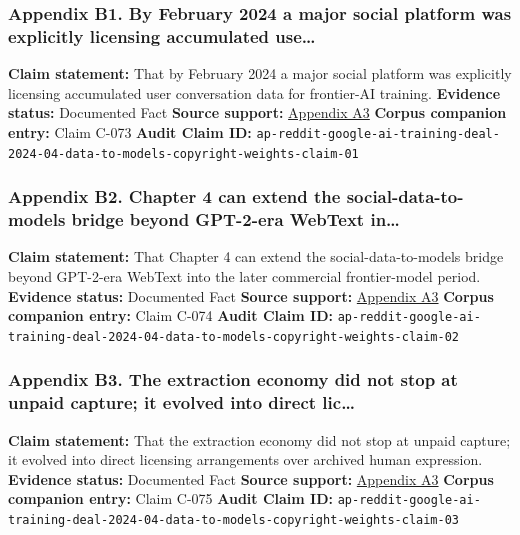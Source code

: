 \documentclass[
  american,
  11pt,
  letterpaper,
]{article}
\begin{document}
\subsubsection{Appendix B1. By February 2024 a major social platform was
explicitly licensing accumulated
use\ldots{}}\label{ch-04-appendix-b1-by-february-2024-a-major-social-platform-was-explicitly-licensing-accumulated-use}

\textbf{Claim statement:} That by February 2024 a major social platform
was explicitly licensing accumulated user conversation data for
frontier-AI training. \textbf{Evidence status:} Documented Fact
\textbf{Source support:}
\hyperref[ch-04-appendix-a3-reddit-strikes-60m-deal-allowing-google-to-train-ai-models-on-its-posts-unveils-ipo-plans]{Appendix
A3} \textbf{Corpus companion entry:} Claim C-073 \textbf{Audit Claim
ID:}
\texttt{ap-reddit-google-ai-training-deal-2024-04-data-to-models-copyright-weights-claim-01}

\subsubsection{Appendix B2. Chapter 4 can extend the
social-data-to-models bridge beyond GPT-2-era WebText
in\ldots{}}\label{ch-04-appendix-b2-chapter-4-can-extend-the-social-data-to-models-bridge-beyond-gpt-2-era-webtext-in}

\textbf{Claim statement:} That Chapter 4 can extend the
social-data-to-models bridge beyond GPT-2-era WebText into the later
commercial frontier-model period. \textbf{Evidence status:} Documented
Fact \textbf{Source support:}
\hyperref[ch-04-appendix-a3-reddit-strikes-60m-deal-allowing-google-to-train-ai-models-on-its-posts-unveils-ipo-plans]{Appendix
A3} \textbf{Corpus companion entry:} Claim C-074 \textbf{Audit Claim
ID:}
\texttt{ap-reddit-google-ai-training-deal-2024-04-data-to-models-copyright-weights-claim-02}

\subsubsection{Appendix B3. The extraction economy did not stop at
unpaid capture; it evolved into direct
lic\ldots{}}\label{ch-04-appendix-b3-the-extraction-economy-did-not-stop-at-unpaid-capture-it-evolved-into-direct-lic}

\textbf{Claim statement:} That the extraction economy did not stop at
unpaid capture; it evolved into direct licensing arrangements over
archived human expression. \textbf{Evidence status:} Documented Fact
\textbf{Source support:}
\hyperref[ch-04-appendix-a3-reddit-strikes-60m-deal-allowing-google-to-train-ai-models-on-its-posts-unveils-ipo-plans]{Appendix
A3} \textbf{Corpus companion entry:} Claim C-075 \textbf{Audit Claim
ID:}
\texttt{ap-reddit-google-ai-training-deal-2024-04-data-to-models-copyright-weights-claim-03}
\end{document}
